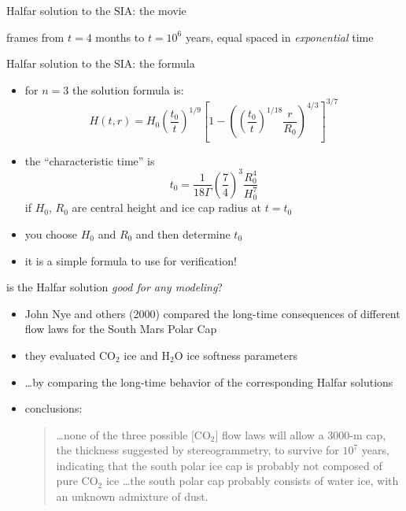 \begin{frame}{Halfar solution to the SIA: the movie}
\label{slide:plothalfar}


\par
\scriptsize 
frames from $t=4$ months to $t = 10^6$ years, equal spaced in \emph{exponential} time
\end{frame}


\begin{frame}{Halfar solution to the SIA: the formula}

\begin{itemize}
\item for $n=3$ the solution formula is:
  $$H(t,r) = H_0 \left(\frac{t_0}{t}\right)^{1/9} \left[1 - \left(\left(\frac{t_0}{t}\right)^{1/18} \frac{r}{R_0}\right)^{4/3}\right]^{3/7}$$
\item the ``characteristic time'' is
  $$t_0 = \frac{1}{18 \Gamma} \left(\frac{7}{4}\right)^3 \frac{R_0^4}{H_0^{7}}$$
if $H_0$, $R_0$ are central height and ice cap radius at $t=t_0$
\item you choose $H_0$ and $R_0$ and then determine $t_0$
\item it is a simple formula to use for verification!
\end{itemize}
\end{frame}


\begin{frame}{is the Halfar solution \emph{good for any modeling}?}

\begin{itemize}
\item John Nye and others (2000)\nocite{NyeIcarus2000} compared the long-time consequences of different flow laws for the South Mars Polar Cap
\item they evaluated $\text{CO}_2$ ice and $\text{H}_2\text{O}$ ice softness parameters
\item \dots by comparing the long-time behavior of the corresponding Halfar solutions
\item conclusions:
  \begin{quote}
  \dots none of the three possible [$\text{CO}_2$] flow laws will allow a 3000-m cap, the thickness suggested by stereogrammetry, to survive for $10^7$ years, indicating that the south polar ice cap is probably not composed of pure $\text{CO}_2$ ice \dots the south polar cap probably consists of water ice, with an unknown admixture of dust.
  \end{quote}
\end{itemize}

\end{frame}



